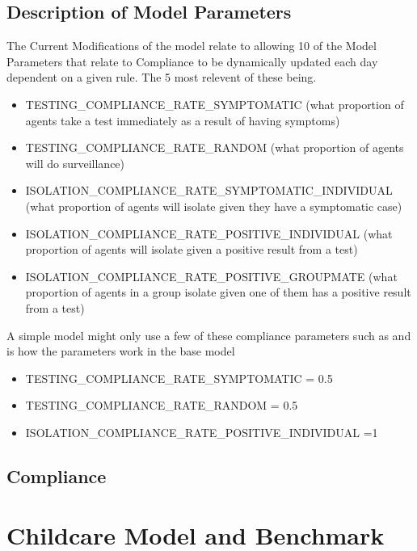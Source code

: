 \documentclass{article}
\begin{document}
\subsection{Description of Model Parameters}
The Current Modifications of the model relate to allowing 10 of the Model Parameters that relate to Compliance to be dynamically updated each day dependent on a given rule. The 5 most relevent of these being.
\begin{itemize}
\item TESTING\_COMPLIANCE\_RATE\_SYMPTOMATIC (what proportion of agents take a test immediately as a result of having symptoms)
\item TESTING\_COMPLIANCE\_RATE\_RANDOM  (what proportion of agents will do surveillance)
\item ISOLATION\_COMPLIANCE\_RATE\_SYMPTOMATIC\_INDIVIDUAL (what proportion of agents will isolate given they have a symptomatic case)
\item ISOLATION\_COMPLIANCE\_RATE\_POSITIVE\_INDIVIDUAL (what proportion of agents will isolate given a positive result from a test)
\item ISOLATION\_COMPLIANCE\_RATE\_POSITIVE\_GROUPMATE (what proportion of agents in a group isolate given one of them has a positive result from a test)
\end{itemize}

A simple model might only use a few of these compliance parameters such as  and is how the parameters work in the base model
\begin{itemize}
\item TESTING\_COMPLIANCE\_RATE\_SYMPTOMATIC = 0.5\
\item TESTING\_COMPLIANCE\_RATE\_RANDOM = 0.5
\item ISOLATION\_COMPLIANCE\_RATE\_POSITIVE\_INDIVIDUAL =1
\end{itemize}


\subsection{Compliance}


\section{Childcare Model and Benchmark}
\end{document}
